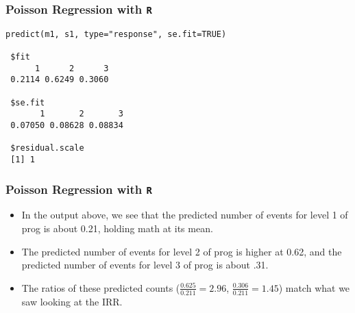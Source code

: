 \documentclass[00-GLMregslides.tex]{subfiles}
\begin{document}
\begin{frame}[fragile]

\frametitle{Poisson Regression with \texttt{R}}
\normalsize 

\begin{framed}
\begin{verbatim}
predict(m1, s1, type="response", se.fit=TRUE)
 
 $fit
      1      2      3 
 0.2114 0.6249 0.3060 
 
 $se.fit
       1       2       3 
 0.07050 0.08628 0.08834 
 
 $residual.scale
 [1] 1
\end{verbatim}
\end{framed}
\end{frame}

\begin{frame}[fragile]

\frametitle{Poisson Regression with \texttt{R}}
\Large 
\begin{itemize}
\item 
In the output above, we see that the predicted number of events for level 1 of prog is about 0.21, holding math at its mean.
\item The predicted number of events for level 2 of prog is higher at 0.62, and the predicted number of events for level 
3 of prog is about .31. 
\item The ratios of these predicted counts (\(\frac{0.625}{0.211} = 2.96\), \(\frac{0.306}{0.211} = 1.45\)) match what 
we saw looking at the IRR.
\end{itemize}
\end{frame}
\end{document}
